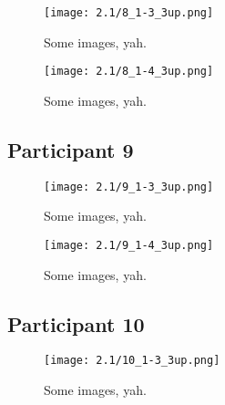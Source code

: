 \begin{figure}[h]
	\begin{center}
	\texttt{[image: 2.1/8\_1-3\_3up.png]}
	\caption{Some images, yah.}
	\end{center}
\end{figure}

\clearpage

\begin{figure}[h]
	\begin{center}
	\texttt{[image: 2.1/8\_1-4\_3up.png]}
	\caption{Some images, yah.}
	\end{center}
\end{figure}


\clearpage

\subsection{Participant 9}

\begin{figure}[h]
	\begin{center}
	\texttt{[image: 2.1/9\_1-3\_3up.png]}
	\caption{Some images, yah.}
	\end{center}
\end{figure}

\clearpage

\begin{figure}[h]
	\begin{center}
	\texttt{[image: 2.1/9\_1-4\_3up.png]}
	\caption{Some images, yah.}
	\end{center}
\end{figure}


\clearpage

\subsection{Participant 10}

\begin{figure}[h]
	\begin{center}
	\texttt{[image: 2.1/10\_1-3\_3up.png]}
	\caption{Some images, yah.}
	\end{center}
\end{figure}

